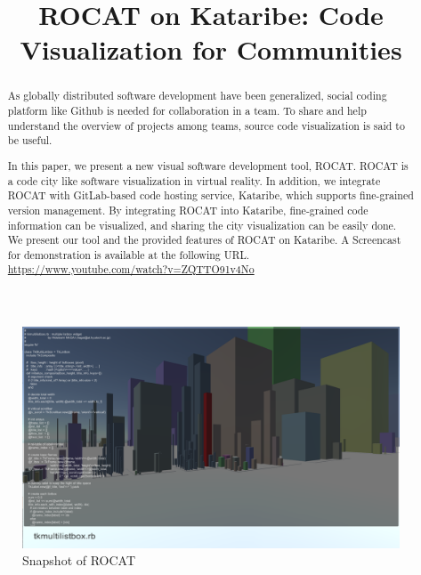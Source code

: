 \documentclass[conference]{IEEEtran}
\begin{document}
\title{ROCAT on Kataribe: Code Visualization for Communities}

\author{
}

\maketitle

\begin{abstract}
As globally distributed software development have been generalized, social coding platform like Github is needed for collaboration in a team. To share and help understand the overview of projects among teams, source code visualization is said to be useful.

In this paper, we present a new visual software development tool, ROCAT. ROCAT is a code city like software visualization in virtual reality. In addition, we integrate ROCAT with GitLab-based code hosting service, Kataribe, which supports fine-grained version management. By integrating ROCAT into Kataribe, fine-grained code information can be visualized, and sharing the city visualization can be easily done. We present our tool and the provided features of ROCAT on Kataribe.
A Screencast for demonstration is available at the following URL.\\
\url{https://www.youtube.com/watch?v=ZQTTO91v4No}
\end{abstract}


\begin{figure}[t!]
\centering
\includegraphics[bb=0 0 1598 937, width=18cm]{rocat.png}
\caption{Snapshot of ROCAT}
\label{figure:rocat}
\end{figure}
\end{document}
